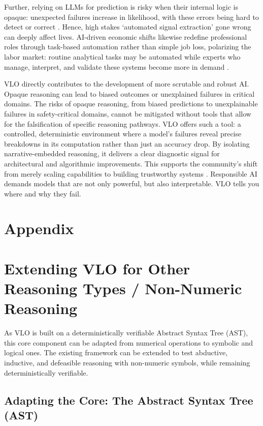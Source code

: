\documentclass{article}
\begin{document}
Further, relying on LLMs for prediction is risky when their internal logic is opaque: unexpected failures increase in likelihood, with these errors being hard to detect or correct \citep{rane2024blackbox_xai}. Hence, high stakes `automated signal extraction' gone wrong can deeply affect lives. AI-driven economic shifts likewise redefine professional roles through task-based automation rather than simple job loss, polarizing the labor market: routine analytical tasks may be automated while experts who manage, interpret, and validate these systems become more in demand \citep{work_of_the_future}.

VLO directly contributes to the development of more scrutable and robust AI. Opaque reasoning can lead to biased outcomes or unexplained failures in critical domains. The risks of opaque reasoning, from biased predictions to unexplainable failures in safety-critical domains, cannot be mitigated without tools that allow for the falsification of specific reasoning pathways. VLO offers such a tool: a controlled, deterministic environment where a model's failures reveal precise breakdowns in its computation rather than just an accuracy drop. By isolating narrative-embedded reasoning, it delivers a clear diagnostic signal for architectural and algorithmic improvements. This supports the community's shift from merely scaling capabilities to building trustworthy systems \citep{stanford_hai_2025_ai_index}. Responsible AI demands models that are not only powerful, but also interpretable. VLO tells you where and why they fail.




\clearpage
\appendix
\section*{Appendix}

\section{Extending VLO for Other Reasoning Types / Non-Numeric Reasoning}
\label{sec:extending_VLO}
As VLO is built on a deterministically verifiable Abstract Syntax Tree (AST), this core component can be adapted from numerical operations to symbolic and logical ones. The existing framework can be extended to test abductive, inductive, and defeasible reasoning with non-numeric symbols, while remaining deterministically verifiable.

\subsection{Adapting the Core: The Abstract Syntax Tree (AST)}
\end{document}
